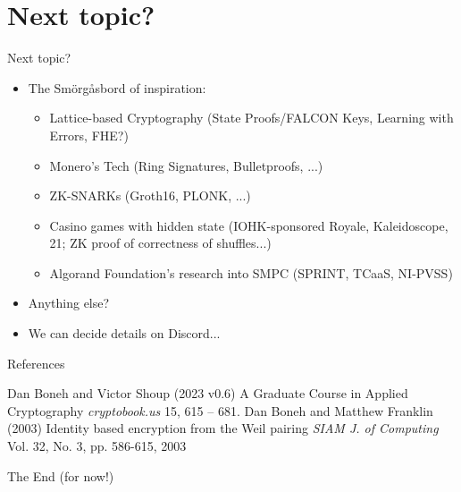 \documentclass[aspectratio=169,xcolor=dvipsnames]{beamer}
\begin{document}
\section{Next topic?}
\begin{frame}{Next topic?}
\begin{itemize}
    \item The Smörgåsbord of inspiration: 
    \begin{itemize}
        \item Lattice-based Cryptography (State Proofs/FALCON Keys, Learning with Errors, FHE?)
        \item Monero's Tech (Ring Signatures, Bulletproofs, ...)
        \item ZK-SNARKs (Groth16, PLONK, ...)
        \item Casino games with hidden state (IOHK-sponsored Royale, Kaleidoscope, 21; ZK proof of correctness of shuffles...)
        \item Algorand Foundation's research into SMPC (SPRINT, TCaaS, NI-PVSS)
    \end{itemize}
    \item Anything else?
    \item We can decide details on Discord...
\end{itemize}
    
\end{frame}



\begin{frame}{References}
    \footnotesize{
        \begin{thebibliography}{99}
             Dan Boneh and Victor Shoup (2023 v0.6)
            \newblock A Graduate Course in Applied Cryptography
            \newblock \emph{cryptobook.us} 15, 615 -- 681.
             Dan Boneh and Matthew Franklin (2003)
            \newblock Identity based encryption from the Weil pairing
            \newblock \emph{SIAM J. of Computing} Vol. 32, No. 3, pp. 586-615, 2003 
        \end{thebibliography}
    }
\end{frame}


\begin{frame}
    \Huge{\centerline{The End (for now!)}}
\end{frame}

\end{document}
